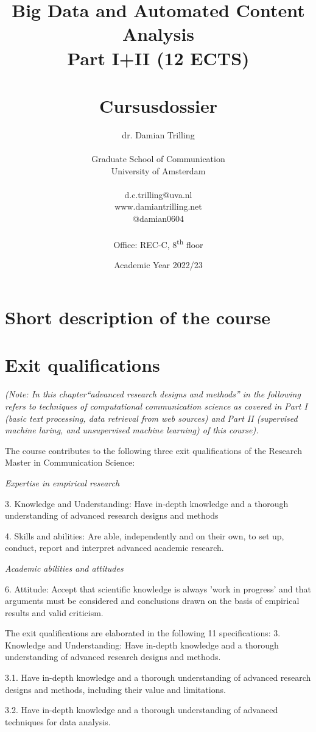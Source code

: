 \documentclass[a4paper,12pt]{report}
\title{Big Data and Automated Content Analysis\\ Part I+II (12 ECTS)\\~\\Cursusdossier}
\author{dr. Damian Trilling\\~\\Graduate School of Communication\\University of Amsterdam\\~\\d.c.trilling@uva.nl\\www.damiantrilling.net\\@damian0604\\~\\Office: REC-C, 8\textsuperscript{th} floor}
\date{Academic Year 2022/23}
\begin{document}
\maketitle

\tableofcontents


\chapter{Short description of the course}



\chapter{Exit qualifications}


\emph{(Note: In this chapter``advanced research designs and methods'' in the following refers to techniques of computational communication science as covered in Part I (basic text processing, data retrieval from web sources) and Part II (supervised machine laring, and unsupervised machine learning) of this course).}


The course contributes to the following three exit qualifications of the Research Master in Communication Science:


\textit{Expertise in empirical research}


	3.	Knowledge and Understanding: Have in-depth knowledge and a thorough understanding of advanced research designs and methods


	4.	Skills and abilities: Are able, independently and on their own, to set up, conduct, report and interpret advanced academic research.


\textit{Academic abilities and attitudes}


	6.	Attitude: Accept that scientific knowledge is always 'work in progress' and that arguments must be considered and conclusions drawn on the basis of empirical results and valid criticism.


The exit qualifications are elaborated in the following 11 specifications:
3. Knowledge and Understanding: Have in-depth knowledge and a thorough understanding of advanced research designs and methods. 


3.1. Have in-depth knowledge and a thorough understanding of advanced research designs and methods, including their value and limitations.


3.2.	Have in-depth knowledge and a thorough understanding of advanced techniques for data analysis.
\end{document}

